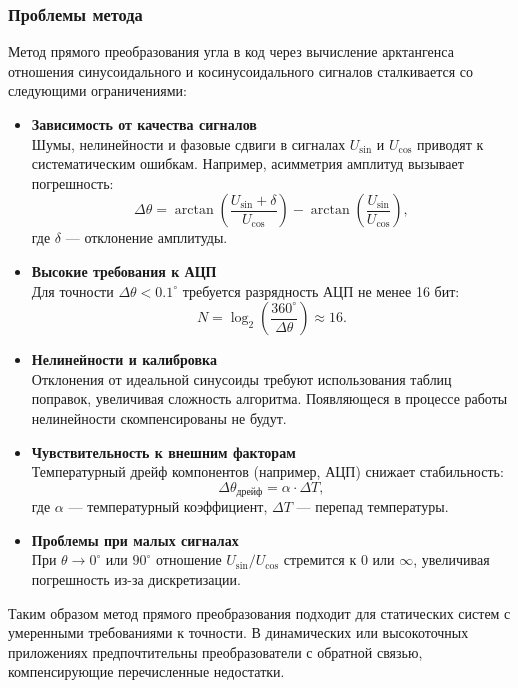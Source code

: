 \subsubsection{Проблемы метода}
Метод прямого преобразования угла в код через вычисление арктангенса отношения синусоидального и косинусоидального сигналов сталкивается со следующими ограничениями:
\begin{itemize}
    \item \textbf{Зависимость от качества сигналов} \\
    Шумы, нелинейности и фазовые сдвиги в сигналах \( U_{\sin} \) и \( U_{\cos} \) приводят к систематическим ошибкам. Например, асимметрия амплитуд вызывает погрешность:
    \[
    \Delta\theta = \arctan\left(\frac{U_{\sin} + \delta}{U_{\cos}}\right) - \arctan\left(\frac{U_{\sin}}{U_{\cos}}\right),
    \]
    где \(\delta\) — отклонение амплитуды.

    \item \textbf{Высокие требования к АЦП} \\
    Для точности \(\Delta\theta < 0.1^\circ\) требуется разрядность АЦП не менее 16 бит:
    \[
    N = \log_2\left(\frac{360^\circ}{\Delta\theta}\right) \approx 16.
    \]

    \item \textbf{Нелинейности и калибровка} \\
    Отклонения от идеальной синусоиды требуют использования таблиц поправок, увеличивая сложность алгоритма. Появляющеся в процессе работы нелинейности скомпенсированы не будут.

    \item \textbf{Чувствительность к внешним факторам} \\
    Температурный дрейф компонентов (например, АЦП) снижает стабильность:
    \[
    \Delta\theta_{\text{дрейф}} = \alpha \cdot \Delta T,
    \]
    где \(\alpha\) — температурный коэффициент, \(\Delta T\) — перепад температуры.

    \item \textbf{Проблемы при малых сигналах} \\
    При \(\theta \to 0^\circ\) или \(90^\circ\) отношение \( U_{\sin}/U_{\cos} \) стремится к \(0\) или \(\infty\), увеличивая погрешность из-за дискретизации.
\end{itemize}

Таким образом метод прямого преобразования подходит для статических систем с умеренными требованиями к точности. 
В динамических или высокоточных приложениях предпочтительны преобразователи с обратной связью, компенсирующие перечисленные недостатки.

